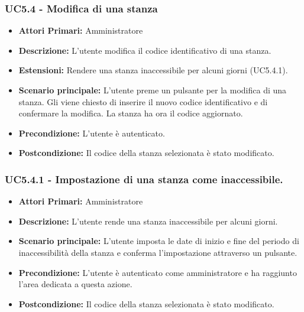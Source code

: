 \subsubsection{ UC5.4 - Modifica di una stanza}
\begin{itemize}
	\item\textbf{Attori Primari:}
	Amministratore 
	\item\textbf{Descrizione:}
	L'utente modifica il codice identificativo di una stanza.
	\item\textbf{Estensioni:}
	Rendere una stanza inaccessibile per alcuni giorni (UC5.4.1).
	\item\textbf{Scenario principale:} 
	L'utente preme un pulsante per la modifica di una stanza. Gli viene chiesto di inserire il nuovo codice identificativo e di confermare la modifica. La stanza ha ora il codice aggiornato.
	\item\textbf{Precondizione:} 
	L'utente è autenticato.
	\item\textbf{Postcondizione:}
	Il codice della stanza selezionata è stato modificato.
\end{itemize}

\subsubsection{ UC5.4.1 - Impostazione di una stanza come inaccessibile.}
\begin{itemize}
	\item\textbf{Attori Primari:}
	Amministratore 
	\item\textbf{Descrizione:}
	L'utente rende una stanza inaccessibile per alcuni giorni.
	\item\textbf{Scenario principale:} 
	L'utente imposta le date di inizio e fine del periodo di inaccessibilità della stanza e conferma l'impostazione attraverso un pulsante.
	\item\textbf{Precondizione:} 
	L'utente è autenticato come amministratore e ha raggiunto l'area dedicata a questa azione.
	\item\textbf{Postcondizione:}
	Il codice della stanza selezionata è stato modificato.
\end{itemize}

